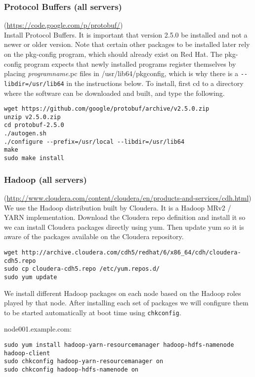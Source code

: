 \subsubsection{Protocol Buffers (all servers)} (\url{https://code.google.com/p/protobuf/})\\
Install Protocol Buffers.  It is important that version 2.5.0 be installed
and not a newer or older version.  Note that certain other packages
to be installed later rely on the pkg-config program, which should
already exist on Red Hat.  The pkg-config program expects that newly
installed programs register themselves by placing \emph{programname}.pc files in
/usr/lib64/pkgconfig, which is why there is a \verb|--libdir=/usr/lib64|
in the instructions below.  To install, first cd to a directory where
the software can be downloaded and built, and type the following.

\begin{verbatim}
wget https://github.com/google/protobuf/archive/v2.5.0.zip
unzip v2.5.0.zip
cd protobuf-2.5.0
./autogen.sh 
./configure --prefix=/usr/local --libdir=/usr/lib64
make
sudo make install
\end{verbatim}

\subsubsection{Hadoop (all servers)} (\url{http://www.cloudera.com/content/cloudera/en/products-and-services/cdh.html})\\
We use the Hadoop distribution built by Cloudera.  It is a Hadoop MRv2 /
YARN implementation.  Download the Cloudera repo definition and install
it so we can install Cloudera packages directly using yum.  Then update
yum so it is aware of the packages available on the Cloudera repository.

\begin{verbatim}
wget http://archive.cloudera.com/cdh5/redhat/6/x86_64/cdh/cloudera-cdh5.repo
sudo cp cloudera-cdh5.repo /etc/yum.repos.d/
sudo yum update
\end{verbatim}

We install different Hadoop packages on each node based on the Hadoop roles
played by that node.  After installing each set of packages we will configure
them to be started automatically at boot time using \verb|chkconfig|.

node001.example.com:
\begin{verbatim}
sudo yum install hadoop-yarn-resourcemanager hadoop-hdfs-namenode hadoop-client
sudo chkconfig hadoop-yarn-resourcemanager on
sudo chkconfig hadoop-hdfs-namenode on
\end{verbatim}

